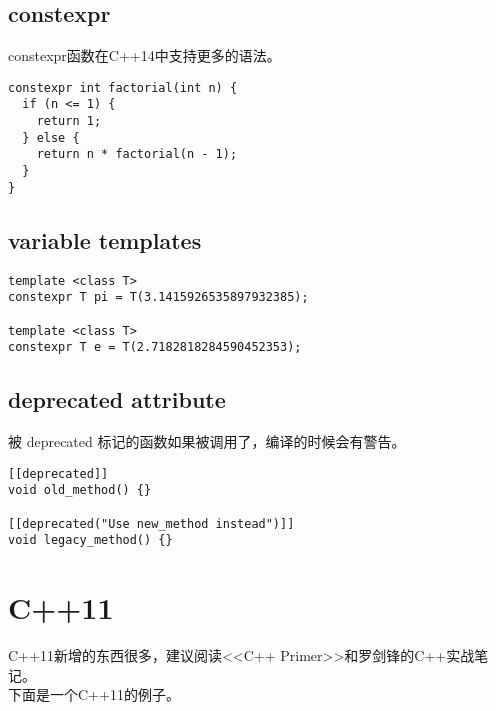 \subsection{constexpr}

constexpr函数在C++14中支持更多的语法。

\begin{verbatim}
constexpr int factorial(int n) {
  if (n <= 1) {
    return 1;
  } else {
    return n * factorial(n - 1);
  }
}
\end{verbatim}

\subsection{variable templates}

\begin{verbatim}
template <class T>
constexpr T pi = T(3.1415926535897932385);

template <class T>
constexpr T e = T(2.7182818284590452353);
\end{verbatim}

\subsection{deprecated attribute}

被 deprecated 标记的函数如果被调用了，编译的时候会有警告。

\begin{verbatim}
[[deprecated]]
void old_method() {}

[[deprecated("Use new_method instead")]]
void legacy_method() {}
\end{verbatim}

\section{C++11}

C++11新增的东西很多，建议阅读<<C++ Primer>>和罗剑锋的C++实战笔记。 \\
下面是一个C++11的例子。

